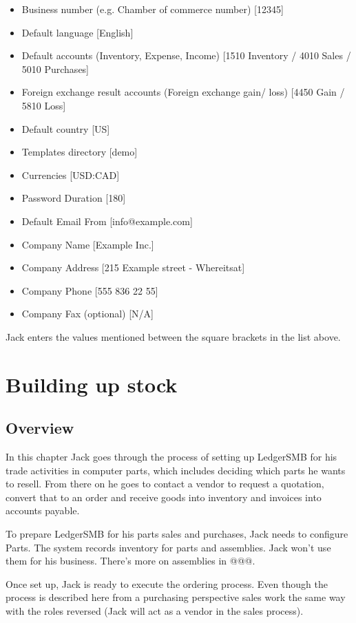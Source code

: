 \begin{itemize}
\item Business number (e.g. Chamber of commerce number) [12345]
\item Default language [English]
\item Default accounts (Inventory, Expense, Income) [1510 Inventory / 4010 Sales / 5010 Purchases]
\item Foreign exchange result accounts (Foreign exchange gain/ loss) [4450 Gain / 5810 Loss]
\item Default country [US]
\item Templates directory [demo]
\item Currencies [USD:CAD]
\item Password Duration [180]
\item Default Email From [info@example.com]
\item Company Name [Example Inc.]
\item Company Address [215 Example street - Whereitsat]
\item Company Phone [555 836 22 55]
\item Company Fax (optional) [N/A]
\end{itemize}

Jack enters the values mentioned between the square brackets in the list above.



\chapter{Building up stock}
\label{cha-building-up-stock}

\section{Overview}
\label{sec-stock-overview}

In this chapter Jack goes through the process of setting up LedgerSMB for his
trade activities in computer parts, which includes deciding which parts he wants to
resell. From there on he goes to contact a vendor to request a quotation, convert that
to an order and receive goods into inventory and invoices into accounts payable.

To prepare LedgerSMB for his parts sales and purchases, Jack needs to configure Parts.
The system records inventory for parts and assemblies. Jack won't use them for his
business. There's more on assemblies in @@@.

Once set up, Jack is ready to execute the ordering process. Even though the process
is described here from a purchasing perspective sales work the same way with the roles
reversed (Jack will act as a vendor in the sales process).

